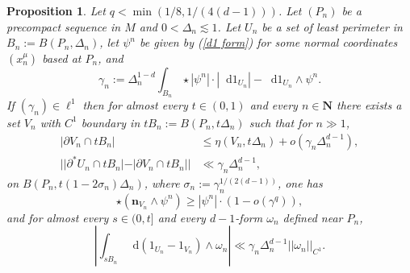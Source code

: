 \documentclass[reqno,10pt]{amsart}
\newcommand{\NN}{\mathbf{N}}
\newcommand*\dif{\mathop{}\!\mathrm{d}}
\newcommand{\normal}{\mathbf n}
\newtheorem{proposition}[theorem]{Proposition}
\theoremstyle{definition}
\numberwithin{equation}{section}
\begin{document}
\begin{proposition}\label{mollifier quant}
Let $q < \min(1/8, 1/(4(d - 1)))$.
Let $(P_n)$ be a precompact sequence in $M$ and $0 < \Delta_n \lesssim 1$.
Let $U_n$ be a set of least perimeter in $B_n := B(P_n, \Delta_n)$, let $\psi^n$ be given by (\ref{d1 form}) for some normal coordinates $(x^\mu_n)$ based at $P_n$, and
$$\gamma_n := \Delta_n^{1 - d} \int_{B_n} \star |\psi^n| \cdot |\dif 1_{U_n}| - \dif 1_{U_n} \wedge \psi^n.$$
If $(\gamma_n) \in \ell^1$ then for almost every $t \in (0, 1)$ and every $n \in \NN$ there exists a set $V_n$ with $C^1$ boundary in $tB_n := B(P_n, t\Delta_n)$ such that for $n \gg 1$,
\begin{align}
|\partial V_n \cap tB_n| &\leq \eta(V_n, t\Delta_n) + o(\gamma_n \Delta_n^{d - 1}), \label{mollifier quant1}\\
||\partial^* U_n \cap tB_n| - |\partial V_n \cap tB_n|| &\ll \gamma_n \Delta_n^{d - 1}, \label{mollifier quant2}
\end{align}
on $B(P_n, t(1 - 2\sigma_n)\Delta_n)$, where $\sigma_n := \gamma_n^{1/(2(d - 1))}$, one has
\begin{equation}
\star(\normal_{V_n} \wedge \psi^n) \geq |\psi^n| \cdot (1 - o(\gamma^q)), \label{mollifier quant4}
\end{equation}
and for almost every $s \in (0, t]$ and every $d-1$-form $\omega_n$ defined near $P_n$,
\begin{equation}\label{mollifier quant3}
\left|\int_{sB_n} \dif(1_{U_n} - 1_{V_n}) \wedge \omega_n\right| \ll \gamma_n \Delta_n^{d - 1} ||\omega_n||_{C^1}.
\end{equation}
\end{proposition}
\end{document}
